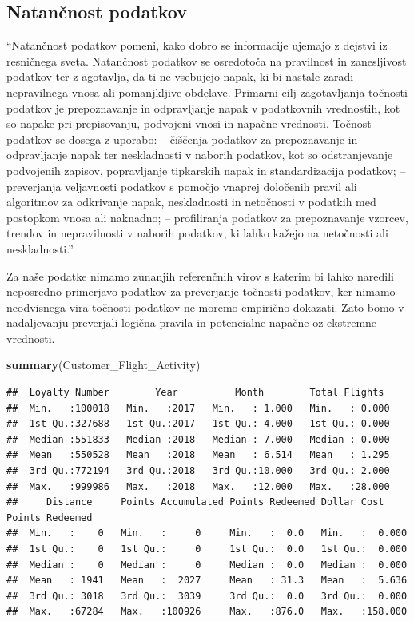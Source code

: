 \documentclass[
]{article}
\newenvironment{Shaded}{\begin{snugshade}}{\end{snugshade}}
\newcommand{\FunctionTok}[1]{\textcolor[rgb]{0.13,0.29,0.53}{\textbf{#1}}}
\newcommand{\NormalTok}[1]{#1}
\begin{document}
\subsection{Natančnost podatkov}\label{natanux10dnost-podatkov}

``Natančnost podatkov pomeni, kako dobro se informacije ujemajo z
dejstvi iz resničnega sveta. Natančnost podatkov se osredotoča na
pravilnost in zanesljivost podatkov ter z agotavlja, da ti ne vsebujejo
napak, ki bi nastale zaradi nepravilnega vnosa ali pomanjkljive
obdelave. Primarni cilj zagotavljanja točnosti podatkov je prepoznavanje
in odpravljanje napak v podatkovnih vrednostih, kot so napake pri
prepisovanju, podvojeni vnosi in napačne vrednosti. Točnost podatkov se
dosega z uporabo: -- čiščenja podatkov za prepoznavanje in odpravljanje
napak ter neskladnosti v naborih podatkov, kot so odstranjevanje
podvojenih zapisov, popravljanje tipkarskih napak in standardizacija
podatkov; -- preverjanja veljavnosti podatkov s pomočjo vnaprej
določenih pravil ali algoritmov za odkrivanje napak, neskladnosti in
netočnosti v podatkih med postopkom vnosa ali naknadno; -- profiliranja
podatkov za prepoznavanje vzorcev, trendov in nepravilnosti v naborih
podatkov, ki lahko kažejo na netočnosti ali neskladnosti.''

Za naše podatke nimamo zunanjih referenčnih virov s katerim bi lahko
naredili neposredno primerjavo podatkov za preverjanje točnosti
podatkov, ker nimamo neodvisnega vira točnosti podatkov ne moremo
empirično dokazati. Zato bomo v nadaljevanju preverjali logična pravila
in potencialne napačne oz ekstremne vrednosti.

\begin{Shaded}
\begin{Highlighting}[]
\FunctionTok{summary}\NormalTok{(Customer\_Flight\_Activity)}
\end{Highlighting}
\end{Shaded}

\begin{verbatim}
##  Loyalty Number        Year          Month        Total Flights   
##  Min.   :100018   Min.   :2017   Min.   : 1.000   Min.   : 0.000  
##  1st Qu.:327688   1st Qu.:2017   1st Qu.: 4.000   1st Qu.: 0.000  
##  Median :551833   Median :2018   Median : 7.000   Median : 0.000  
##  Mean   :550528   Mean   :2018   Mean   : 6.514   Mean   : 1.295  
##  3rd Qu.:772194   3rd Qu.:2018   3rd Qu.:10.000   3rd Qu.: 2.000  
##  Max.   :999986   Max.   :2018   Max.   :12.000   Max.   :28.000  
##     Distance     Points Accumulated Points Redeemed Dollar Cost Points Redeemed
##  Min.   :    0   Min.   :     0     Min.   :  0.0   Min.   :  0.000            
##  1st Qu.:    0   1st Qu.:     0     1st Qu.:  0.0   1st Qu.:  0.000            
##  Median :    0   Median :     0     Median :  0.0   Median :  0.000            
##  Mean   : 1941   Mean   :  2027     Mean   : 31.3   Mean   :  5.636            
##  3rd Qu.: 3018   3rd Qu.:  3039     3rd Qu.:  0.0   3rd Qu.:  0.000            
##  Max.   :67284   Max.   :100926     Max.   :876.0   Max.   :158.000
\end{verbatim}
\end{document}
